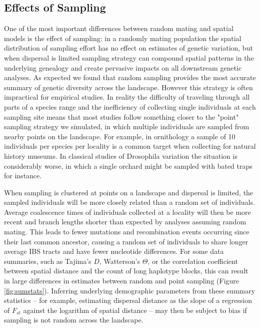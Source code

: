 \documentclass[11pt,twoside,lineno]{preprint}
\begin{document}
\subsection{Effects of Sampling}
One of the most important differences between random mating and spatial models is the effect of sampling: in a randomly mating population the spatial distribution of sampling effort has no effect on estimates of genetic variation, but when dispersal is limited sampling strategy can compound spatial patterns in the underlying genealogy and create pervasive impacts on all downstream genetic analyses. As expected we found that random sampling provides the most accurate summary of genetic diversity across the landscape. However this strategy is often impractical for empirical studies. In reality the difficulty of traveling through all parts of a species range and the inefficiency of collecting single individuals at each sampling site means that most studies follow something closer to the "point" sampling strategy we simulated, in which multiple individuals are sampled from nearby points on the landscape. For example, in ornithology a sample of 10 individuals per species per locality is a common target when collecting for natural history museums. In classical studies of Drosophila variation the situation is considerably worse, in which a single orchard might be sampled with bated traps for instance. 

When sampling is clustered at points on a landscape and dispersal is limited, the sampled individuals will be more closely related than a random set of individuals. Average coalescence times of individuals collected at a locality will then be more recent and branch lengths shorter than expected by analyses assuming random mating. This leads to fewer mutations and recombination events occurring since their last common ancestor, causing a random set of individuals to share longer average IBS tracts and have fewer nucleotide differences. For some data summaries, such as Tajima's $D$, Watterson's $\Theta$, or the correlation coefficient between spatial distance and the count of long haplotype blocks, this can result in large differences in estimates between random and point sampling (Figure \ref{fig:sumstats}). Inferring underlying demographic parameters from these summary statistics -- for example, estimating dispersal distance as the slope of a regression of $F_{st}$ against the logarithm of spatial distance \citep{Rousset1997} -- may then be subject to bias if sampling is not random across the landscape. 
\end{document}
